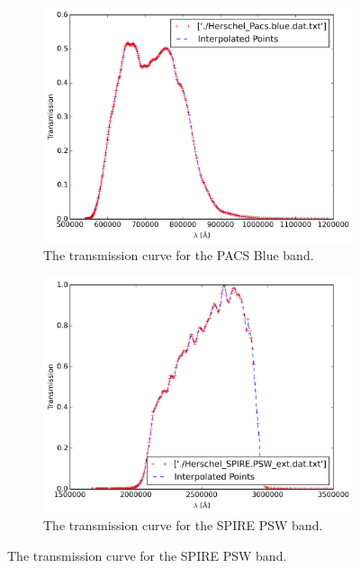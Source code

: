 \documentclass{report}
\begin{document}
\begin{figure}
\centering

\begin{subfigure}[b]{.45\linewidth}
\includegraphics[width=\linewidth]{../img/interpolated_blue.png}
\caption{The transmission curve for the PACS Blue band.}\label{fig:blue}
\end{subfigure}
\begin{subfigure}[b]{.45\linewidth}
\includegraphics[width=\linewidth]{../img/interpolated_psw.png}
\caption{The transmission curve for the SPIRE PSW band.}\label{fig:psw}
\end{subfigure}


\end{figure}
\end{document}
